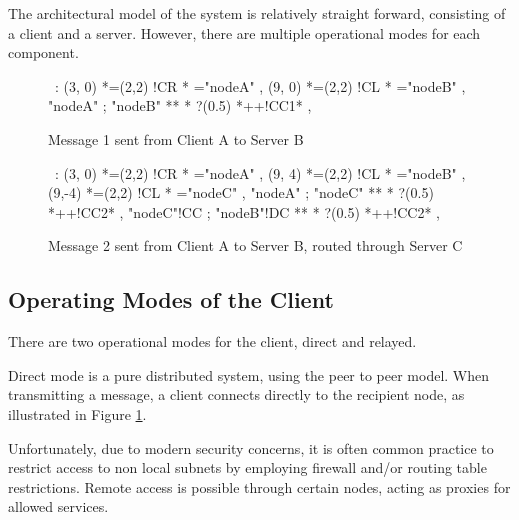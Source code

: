 The architectural model of the system is relatively straight forward,
consisting of a client and a server. However, there are multiple
operational modes for each component.

\begin{figure}[H]

\begin{center}
\ \xy<1cm,0cm>:
(3, 0) *=(2,2) !CR  *\frm{-} ="nodeA" , 
(9, 0) *=(2,2) !CL  *\frm{=} ="nodeB" , 
"nodeA" ; "nodeB" **\dir{-} *\dir{>} ?(0.5) *++!CC{1}* , 
\endxy
\end{center}

\label{fig:client}

\caption{Message 1 sent from Client A to Server B}

\end{figure}

\begin{figure}[H]

\begin{center}
\ \xy<1cm,0cm>:
(3, 0) *=(2,2) !CR  *\frm{-} ="nodeA" , 
(9, 4) *=(2,2) !CL  *\frm{=} ="nodeB" , 
(9,-4) *=(2,2) !CL  *\frm{=} ="nodeC" , 
"nodeA" ; "nodeC" **\dir{-} *\dir{>} ?(0.5) *++!CC{2}* , 
"nodeC"!CC ; "nodeB"!DC **\dir{-} *\dir{>} ?(0.5) *++!CC{2}* , 
\endxy
\end{center}

\caption{Message 2 sent from Client A to Server B, routed through Server C}

\label{fig:relay}

\end{figure}

\subsection{Operating Modes of the Client}

There are two operational modes for the client, direct and relayed.

Direct mode is a pure distributed system, using the peer to peer model.
When transmitting a message, a client connects directly to the
recipient node, as illustrated in Figure \ref{fig:client}.


Unfortunately, due to modern security concerns, it is often common 
practice to restrict access to non local subnets by employing firewall
and/or routing table restrictions. Remote access is possible through
certain nodes, acting as proxies for allowed services. 


